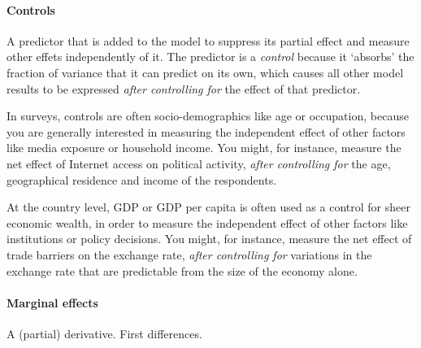 
\paragraph{Controls}

A predictor that is added to the model to suppress its partial effect and measure other effets independently of it. The predictor is a \emph{control} because it `absorbs' the fraction of variance that it can predict on its own, which causes all other model results to be expressed \emph{after controlling for} the effect of that predictor.%

In surveys, controls are often socio-demographics like age or occupation, because you are generally interested in measuring the independent effect of other factors like media exposure or household income. You might, for instance, measure the net effect of Internet access on political activity, \emph{after controlling for} the age, geographical residence and income of the respondents.%

At the country level, GDP or GDP per capita is often used as a control for sheer economic wealth, in order to measure the independent effect of other factors like institutions or policy decisions. You might, for instance, measure the net effect of trade barriers on the exchange rate, \emph{after controlling for} variations in the exchange rate that are predictable from the size of the economy alone.%

\paragraph{Marginal effects}

A (partial) derivative. First differences.

